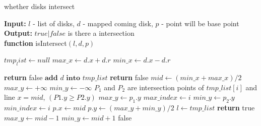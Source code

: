 \documentclass[10pt, conference, compsocconf]{IEEEtran}
\begin{document}
\begin{algorithm}
    \caption{whether disks intersect}
    \begin{flushleft}
        \textbf{Input:} $l$ - list of disks, $d$ - mapped coming disk, $p$ - point will be base point\\
        \textbf{Output:} $true|false$  is there a intersection\\ 
        \textbf{function} isIntersect$(l, d, p)$
    \end{flushleft}
    \begin{algorithmic}[1]
        \State $tmp_list \gets null$
        \State $max\_x\gets d.x+d.r$
        \State $min\_x\gets d.x-d.r$
        
                \State \textbf{return} false
            \EndIf
        \EndFor
        \State $\textbf{add } d \textbf{ into } tmp\_list$
            \State \textbf{return} false
        \EndIf
            \State $mid \gets (min\_x + max\_x)/2$
            \State $max\_y \gets +\infty$
            \State $min\_y \gets -\infty$
                \State $P_1$ and $P_2$ are intersection points of $tmp\_list[i]$ and line $x=mid$, $(P1.y\geqslant P2.y)$
                    \State $max\_y \gets p_1.y$
                    \State $max\_index \gets i$
                \EndIf
                    \State $min\_y \gets p_2.y$
                    \State $min\_index \gets i$
                \EndIf
            \EndFor
                \State $p.x \gets mid$
                \State $p.y \gets (max\_y+min\_y)/2$
                \State $l \gets tmp\_list$
                \State \textbf{return} true
            \EndIf
                \State $max\_y \gets mid-1$
                \State $min\_y \gets mid+1$
            \EndIf
        \EndWhile
        \Return false
    \end{algorithmic}
\end{algorithm}
\end{document}
